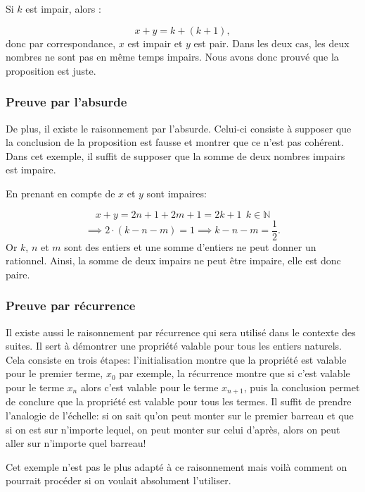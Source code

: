 \documentclass[a4paper, 12pt, french, twoside]{article}
\begin{document}
Si $k$ est impair, alors :

\begin{equation}
    x+y=k+(k+1),
\end{equation}
donc par correspondance, $x$ est impair et $y$ est pair. Dans les deux cas, les deux nombres ne sont pas en même temps impairs. Nous avons donc prouvé que la proposition est juste.

\subsubsection{Preuve par l'absurde}
De plus, il existe le raisonnement par l'absurde. Celui-ci consiste à supposer que la conclusion de la proposition est fausse et montrer que ce n'est pas cohérent. Dans cet exemple, il suffit de supposer que la somme de deux nombres impairs est impaire. 

En prenant en compte de $x$ et $y$ sont impaires:

\begin{equation}
    x+y=2n+1+2m+1=2k+1~~ k\in \mathbb{N}
\end{equation}
\begin{equation}
    \implies 2\cdot (k-n-m)=1\implies k-n-m=\dfrac{1}{2}.  
\end{equation}
Or $k$, $n$ et $m$ sont des entiers et une somme d'entiers ne peut donner un rationnel. Ainsi, la somme de deux impairs ne peut être impaire, elle est donc paire.\\

\subsubsection{Preuve par récurrence}
Il existe aussi le raisonnement par récurrence qui sera utilisé dans le contexte des suites. Il sert à démontrer une propriété valable pour tous les entiers naturels. Cela consiste en trois étapes: l'initialisation montre que la propriété est valable pour le premier terme, $x_0$ par exemple, la récurrence montre que si c'est valable pour le terme $x_n$ alors c'est valable pour le terme $x_{n+1}$, puis la conclusion permet de conclure que la propriété est valable pour tous les termes. Il suffit de prendre l'analogie de l'échelle: si on sait qu'on peut monter sur le premier barreau et que si on est sur n'importe lequel, on peut monter sur celui d'après, alors on peut aller sur n'importe quel barreau! 

Cet exemple n'est pas le plus adapté à ce raisonnement mais voilà comment on pourrait procéder si on voulait absolument l'utiliser.\\
\end{document}
